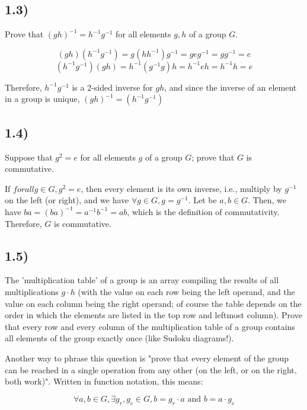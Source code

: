 \subsection*{1.3)}

Prove that $(gh)^{-1} = h^{-1} g^{-1}$ for all elements $g, h$ of a group $G$.

$$(gh)(h^{-1}g^{-1}) = g(hh^{-1})g^{-1} = geg^{-1} = gg^{-1} = e$$
$$(h^{-1}g^{-1})(gh) = h^{-1}(g^{-1}g)h = h^{-1}eh = h^{-1}h = e$$

Therefore, $h^{-1} g^{-1}$ is a 2-sided inverse for $gh$, and since the inverse of an element in a group is unique, $(gh)^{-1} = (h^{-1}g^{-1})$



\subsection*{1.4)}

Suppose that $g^2 = e$ for all elements $g$ of a group $G$; prove that $G$ is commutative.

If $forall g \in G, g^2 = e$, then every element is its own inverse, i.e., multiply by $g^{-1}$ on the left (or right), and we have $\forall g \in G, g = g^{-1}$. Let be $a, b \in G$. Then, we have $ba = (ba)^{-1} = a^{-1}b^{-1} = ab$, which is the definition of commutativity. Therefore, $G$ is commutative.



\subsection*{1.5)}

The 'multiplication table' of a group is an array compiling the results of all multiplications $g \cdot h$ (with the value on each row being the left operand, and the value on each column being the right operand; of course the table depends on the order in which the elements are listed in the top row and leftmost column). Prove that every row and every column of the multiplication table of a group contains all elements of the group exactly once (like Sudoku diagrams!).

Another way to phrase this question is "prove that every element of the group can be reached in a single operation from any other (on the left, or on the right, both work)". Written in function notation, this means:

$$\forall a, b \in G, \exists g_r, g_c \in G, b = g_r \cdot a \text { and } b = a \cdot g_c$$

